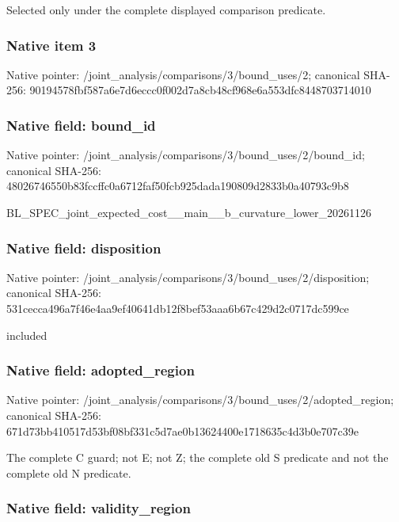 \documentclass[10pt,a4paper]{article}
\begin{document}
Selected only under the complete displayed comparison predicate.


\subsubsection{Native item 3}


Native pointer: /joint\_analysis/comparis\allowbreak{}ons/3/bound\_uses/2; canonical SHA-256: 90194578fbf587a6e7d6eccc\allowbreak{}0f002d7a8cb48cf968e6a553\allowbreak{}dfc8448703714010



\subsubsection{Native field: bound\_id}


Native pointer: /joint\_analysis/comparis\allowbreak{}ons/3/bound\_uses/2/bound\allowbreak{}\_id; canonical SHA-256: 48026746550b83fccffc0a67\allowbreak{}12faf50fcb925dada190809d\allowbreak{}2833b0a40793c9b8


BL\_SPEC\_joint\_expected\_c\allowbreak{}ost\_\_main\_\_b\_curvature\_l\allowbreak{}ower\_20261126


\subsubsection{Native field: disposition}


Native pointer: /joint\_analysis/comparis\allowbreak{}ons/3/bound\_uses/2/dispo\allowbreak{}sition; canonical SHA-256: 531cecca496a7f46e4aa9ef4\allowbreak{}0641db12f8bef53aaa6b67c4\allowbreak{}29d2c0717dc599ce


included


\subsubsection{Native field: adopted\_region}


Native pointer: /joint\_analysis/comparis\allowbreak{}ons/3/bound\_uses/2/adopt\allowbreak{}ed\_region; canonical SHA-256: 671d73bb410517d53bf08bf3\allowbreak{}31c5d7ae0b13624400e17186\allowbreak{}35c4d3b0e707c39e


The complete C guard; not E; not Z; the complete old S predicate and not the complete old N predicate.


\subsubsection{Native field: validity\_region}
\end{document}
